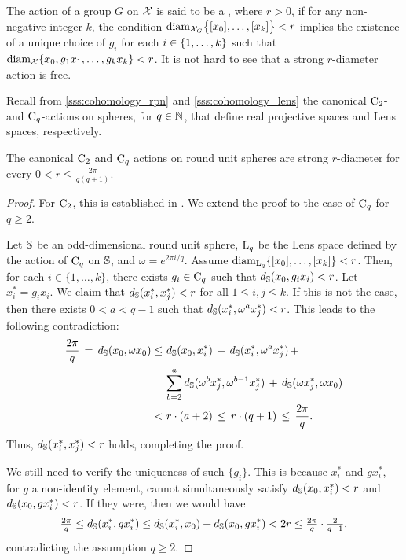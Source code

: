\subsubsection{}\label{sss:strong_r_action}

The action of a group $G$ on $\cX$ is said to be a , where $r > 0$, if for any non-negative integer $k$, the condition $\diam_{\cX_G}\set[\big]{[x_0],\dots,[x_k]} < r$ implies the existence of a unique choice of $g_i$ for each $i \in \set{1,\dots,k}$ such that $\diam_{\cX}\set{x_0, g_1x_1, \dots, g_kx_k} < r$.
It is not hard to see that a strong $r$-diameter action is free.

Recall from \cref{sss:cohomology_rpn} and \cref{sss:cohomology_lens} the canonical $\rC_2$- and $\rC_q$-actions on spheres, for $q \in \N$, that define real projective spaces and Lens spaces, respectively.

\lemma
The canonical $\rC_2$ and $\rC_q$ actions on round unit spheres are strong $r$-diameter for every $0 < r \leq \tfrac{2\pi}{q(q+1)}$.

\begin{proof}
    For $\rC_2$, this is established in \cite[Cor.~4.3]{adams2022metric}. We extend the proof to the case of $\rC_q$ for \(q \geq 2\).

    Let $\bS$  be an odd-dimensional round unit sphere, $\rL_q$ be the Lens space defined by the action of \(\rC_q\) on \(\bS\), and $\omega = e^{2\pi i/q}$.
	Assume $\diam_{\rL_q}\{[x_0], \dots, [x_k]\} < r$.
	Then, for each $i \in \{1, \dots, k\}$, there exists $g_i \in \rC_q$ such that $d_{\bS}(x_0, g_i x_i) < r$. Let $x_i^* = g_i x_i$. We claim that $d_{\bS}(x_i^*, x_j^*) < r$ for all $1 \leq i, j \leq k$.
    If this is not the case, then there exists $0 < a < q-1$ such that $d_{\bS}(x_i^*, \omega^a x_j^*) < r$.
    This leads to the following	contradiction:
    \begin{align*}
    \frac{2\pi}{q} \,=\, d_{\bS}(x_0, \omega x_0)
    \leq\, & \, d_{\bS}(x_0, x_i^*) \, + \, d_{\bS}(x_i^*, \omega^a x_j^*) \, + \, \\
    & \sum_{b=2}^a d_{\bS}(\omega^b x_j^*, \omega^{b-1} x_j^*) \, + \, d_{\bS}(\omega x_j^*, \omega x_0)\\
    < \, & \, r \cdot (a + 2) \, \leq \, r \cdot (q + 1) \, \leq \, \frac{2\pi}{q}.
    \end{align*}
    Thus, $d_{\bS}(x_i^*, x_j^*) < r$ holds, completing the proof.

    We still need to verify the uniqueness of such $\{g_i\}$.
    This is because $x_i^*$ and $gx_i^*$, for $g$ a non-identity element, cannot simultaneously satisfy $d_{\bS}(x_0, x_i^*) < r$ and $d_{\bS}(x_0, gx_i^*) < r$.
    If they were, then we would have
    \[\tfrac{2\pi}{q} \leq d_{\bS}(x_i^*, gx_i^*) \leq d_{\bS}(x_i^*, x_0) + d_{\bS}(x_0, gx_i^*) < 2r \leq \tfrac{2\pi}{q} \cdot \tfrac{2}{q+1},
    \]
    contradicting the assumption $q \geq 2$.
\end{proof}

